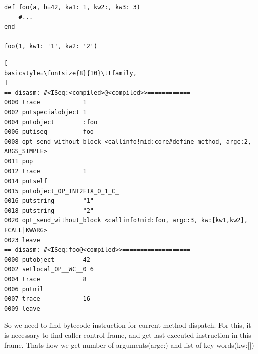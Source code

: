\documentclass[conference]{IEEEtran}
\begin{document}
\begin{lstlisting}
def foo(a, b=42, kw1: 1, kw2:, kw3: 3)
    #...
end
 
foo(1, kw1: '1', kw2: '2')
\end{lstlisting}
\begin{lstlisting}[
basicstyle=\fontsize{8}{10}\ttfamily,
]
== disasm: #<ISeq:<compiled>@<compiled>>============
0000 trace            1
0002 putspecialobject 1
0004 putobject        :foo
0006 putiseq          foo
0008 opt_send_without_block <callinfo!mid:core#define_method, argc:2, ARGS_SIMPLE>
0011 pop
0012 trace            1                                               
0014 putself          
0015 putobject_OP_INT2FIX_O_1_C_ 
0016 putstring        "1"
0018 putstring        "2"
0020 opt_send_without_block <callinfo!mid:foo, argc:3, kw:[kw1,kw2], FCALL|KWARG>
0023 leave
== disasm: #<ISeq:foo@<compiled>>===================
0000 putobject        42
0002 setlocal_OP__WC__0 6
0004 trace            8
0006 putnil
0007 trace            16
0009 leave    
\end{lstlisting}
So we need to find bytecode instruction for current method dispatch. For this, it is necessary to find caller control
frame, and get last executed instruction in this frame. Thats how we get number of arguments(argc:) and list of key
words(kw:[])
\end{document}
